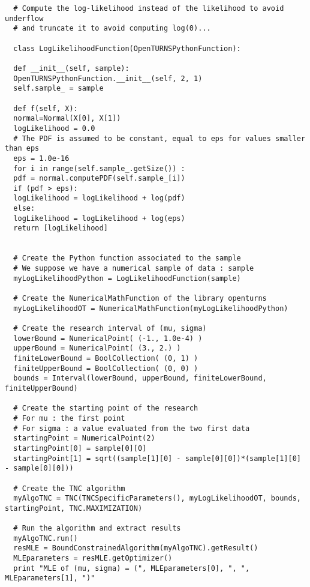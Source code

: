 \begin{lstlisting}
  # Compute the log-likelihood instead of the likelihood to avoid underflow
  # and truncate it to avoid computing log(0)...

  class LogLikelihoodFunction(OpenTURNSPythonFunction):

  def __init__(self, sample):
  OpenTURNSPythonFunction.__init__(self, 2, 1)
  self.sample_ = sample

  def f(self, X):
  normal=Normal(X[0], X[1])
  logLikelihood = 0.0
  # The PDF is assumed to be constant, equal to eps for values smaller than eps
  eps = 1.0e-16
  for i in range(self.sample_.getSize()) :
  pdf = normal.computePDF(self.sample_[i])
  if (pdf > eps):
  logLikelihood = logLikelihood + log(pdf)
  else:
  logLikelihood = logLikelihood + log(eps)
  return [logLikelihood]


  # Create the Python function associated to the sample
  # We suppose we have a numerical sample of data : sample
  myLogLikelihoodPython = LogLikelihoodFunction(sample)

  # Create the NumericalMathFunction of the library openturns
  myLogLikelihoodOT = NumericalMathFunction(myLogLikelihoodPython)

  # Create the research interval of (mu, sigma)
  lowerBound = NumericalPoint( (-1., 1.0e-4) )
  upperBound = NumericalPoint( (3., 2.) )
  finiteLowerBound = BoolCollection( (0, 1) )
  finiteUpperBound = BoolCollection( (0, 0) )
  bounds = Interval(lowerBound, upperBound, finiteLowerBound, finiteUpperBound)

  # Create the starting point of the research
  # For mu : the first point
  # For sigma : a value evaluated from the two first data
  startingPoint = NumericalPoint(2)
  startingPoint[0] = sample[0][0]
  startingPoint[1] = sqrt((sample[1][0] - sample[0][0])*(sample[1][0] - sample[0][0]))

  # Create the TNC algorithm
  myAlgoTNC = TNC(TNCSpecificParameters(), myLogLikelihoodOT, bounds, startingPoint, TNC.MAXIMIZATION)

  # Run the algorithm and extract results
  myAlgoTNC.run()
  resMLE = BoundConstrainedAlgorithm(myAlgoTNC).getResult()
  MLEparameters = resMLE.getOptimizer()
  print "MLE of (mu, sigma) = (", MLEparameters[0], ", ", MLEparameters[1], ")"
\end{lstlisting}




